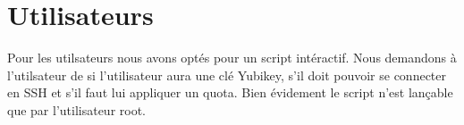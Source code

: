 \section{Utilisateurs}
Pour les utilsateurs nous avons optés pour un script intéractif. Nous demandons à l'utilsateur de si l'utilisateur aura une clé Yubikey, s'il doit pouvoir se connecter en SSH et s'il faut lui appliquer un quota. Bien évidement le script n'est lançable que par l'utilisateur root.




